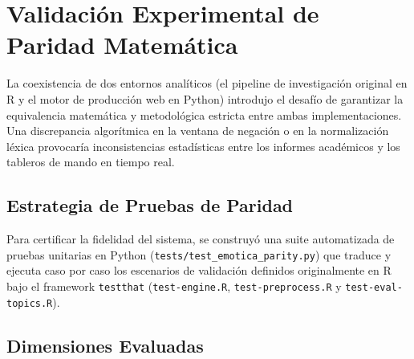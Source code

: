\section{Validación Experimental de Paridad Matemática}
\label{sec:paridad_experimental}

La coexistencia de dos entornos analíticos (el pipeline de investigación original en R y el motor de producción web en Python) introdujo el desafío de garantizar la equivalencia matemática y metodológica estricta entre ambas implementaciones. Una discrepancia algorítmica en la ventana de negación o en la normalización léxica provocaría inconsistencias estadísticas entre los informes académicos y los tableros de mando en tiempo real.

\subsection{Estrategia de Pruebas de Paridad}

Para certificar la fidelidad del sistema, se construyó una suite automatizada de pruebas unitarias en Python (\texttt{tests/test\_emotica\_parity.py}) que traduce y ejecuta caso por caso los escenarios de validación definidos originalmente en R bajo el framework \texttt{testthat} (\texttt{test-engine.R}, \texttt{test-preprocess.R} y \texttt{test-eval-topics.R}).

\subsection{Dimensiones Evaluadas}

